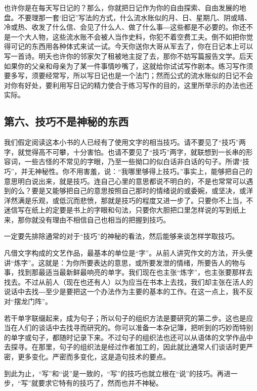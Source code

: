 \documentclass[12pt,a5paper]{ctexbook}
\begin{document}
也许你是在每天写日记的？那么，你就把日记作为你的自由探索、自由发展的地盘。不要理那一套‘旧记”写法的方式，什么流水账似的月、日、星期几、阴或晴、冷或热、收发了什么信、会见了什么人、做了什么事―这些都是不必要的。你还不是一个大人物，这些流水账不会被人当作史料，你犯不着空费工夫。倒不如把你觉得可记的东西用各种体式来试一试。今天你送你大哥从军去了，你在日记本上可以写一首诗。明夭也许你的邻家欠了租被地主捉了去，那你不妨写篇报告文学。后天如果你的父亲和母亲为了某一件事情吵嘴了，这就给你试试写作剧本。练习写作须要多写，须要经常写，所以写日记也是一个法门；然而公式的流水账似的日记不会对你有好处，要利用写日记的精力使合于练习写作的目的，这里所举示的办法也还实际。

\subsection{第六、技巧不是神秘的东西}
我们假定阅读这本小书的人已经有了使用文字的相当技巧。请不要见了“技巧”两字，就觉得高不可攀，十分害怕。也请不要见了“技巧”两字，就联想到一长串的形容词，一些古怪的不常见的字眼，乃至一些拗口的似白话非白话的句子。所谓“技巧”，并无神秘性。你不用害羞，说：“我哪里够得上技巧。”事实上，能够把自己的意思明白说出来，就是技巧。连自己心里的意思都说不明白的，不是也常常可以遇到的么？要是又能够把自己的意思按照自己那时的情绪说的或委婉，或坚决，或洋洋然满是乐观，或低沉而悲愤，那就是技巧的程度又进一步了。只要你不上当，不迷信写在纸上的定要是书上的字眼和句法，只要你大胆把口里怎样说的写到纸上来，那你就没有理由不相信自己也相当的把握到技巧。

一定要先排除通常的对于“技巧”的神秘的看法，然后能够来谈怎样学取技巧。

凡借文字构成的文艺作品，最基本的单位是“字”。从前人讲究作文的方法，开头便讲“炼字”。这就是：为你所要表达的意思，或所要发泄的情绪，所要告人的物与事，找到那最适当最新鲜最响亮的单字。我们现在也主张“炼字”，也主张要那样去找去。不过从前人（现在也还有人）以为应当在书本上去找，我们却主张在活人的说话中去找―至少是要把这一个办法作为主要的基本的工作。在这一点上，我不反对“摆龙门阵”。

若干单字联缀起来，成为句子；所以句子的组织方法是要研究的第二步。这也是应当在人们的谈话中去找寻而研究的。你可以准备一本杂记簿，把听到的巧妙而特别的单字或句子，都随时记录下来。不过句子的组织法也还可以从语体的文学作品中去探寻。在那里，句子的组织法是经过作者加工的，因此就比通常人们谈话时更严密，更多变化。严密而多变化，这是造句技术的要点。

到此为止，“写”和“说”是一致的，“写”的技巧也就立根在“说”的技巧。再进一步，“写”就要求它特有的技巧了，然而也并不神秘。
\end{document}
